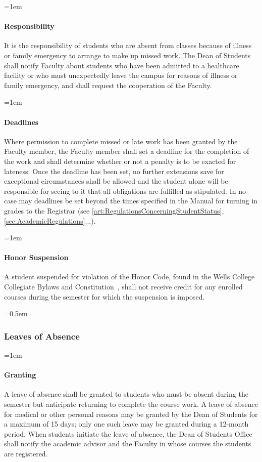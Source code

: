 \documentclass{manual}
\newcommand{\constitution}{Wells College Collegiate Bylaws and Constitution~}
\let\oldsubsubsection\subsubsection
\renewcommand\subsubsection{\leftskip=0.5em\oldsubsubsection}
\let\oldparagraph\paragraph
\renewcommand\paragraph{\leftskip=1em\oldparagraph}
\begin{document}
			\paragraph{Responsibility}
			It is the responsibility of students who are absent from classes because of illness or family emergency to arrange to make up missed work. The Dean of Students shall notify Faculty about students who have been admitted to a healthcare facility or who must unexpectedly leave the campus for reasons of illness or family emergency, and shall request the cooperation of the Faculty.

			\paragraph{Deadlines}
			Where permission to complete missed or late work has been granted by the Faculty member, the Faculty member shall set a deadline for the completion of the work and shall determine whether or not a penalty is to be exacted for lateness. Once the deadline has been set, no further extensions save for exceptional circumstances shall be allowed and the student alone will be responsible for seeing to it that all obligations are fulfilled as stipulated. In no case may deadlines be set beyond the times specified in the Manual for turning in grades to the Registrar (see \cref{art:RegulationsConcerningStudentStatus}, \cref{sec:AcademicRegulations}...).

			\paragraph{Honor Suspension}
			A student suspended for violation of the Honor Code, found in the \constitution, shall not receive credit for any enrolled courses during the semester for which the suspension is imposed.

		\subsubsection{Leaves of Absence}

			\paragraph{Granting} 

			A leave of absence shall be granted to students who must be absent during the semester but anticipate returning to complete the course work. A leave of absence for medical or other personal reasons may be granted by the Dean of Students for a maximum of 15 days; only one such leave may be granted during a 12-month period. When students initiate the leave of absence, the Dean of Students Office shall notify the academic advisor and the Faculty in whose courses the students are registered.
\end{document}
